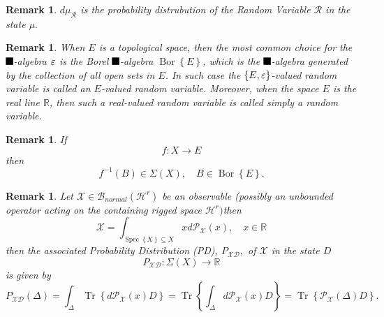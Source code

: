 \documentclass[aps,preprint]{revtex4}%
\providecommand{\U}[1]{\protect\rule{.1in}{.1in}}
\newtheorem{remark}[theorem]{Remark}
\begin{document}
\begin{remark}
$d\mu_{\mathcal{R}}$ is the probability distrubution of the Random Variable
$\mathcal{R}$ in the state $\mu.$
\end{remark}

\begin{remark}
When $E$ is a topological space, then the most common choice for the $\U{3c3}
$-algebra ${\LARGE \varepsilon}$ is the Borel $\U{3c3} $-algebra
$\operatorname*{Bor}\left\{  E\right\}  $, which is the $\U{3c3} $-algebra
generated by the collection of all open sets in $E$. In such case the
$\left\{  E,{\LARGE \varepsilon}\right\}  $-valued random variable is called
an $E$-valued random variable. Moreover, when the space $E$ is the real line
$\mathbb{R}$, then such a real-valued random variable is called simply a
random variable.
\end{remark}

\begin{remark}
If
\begin{equation}
f:X\rightarrow E
\end{equation}
then
\begin{equation}
f^{-1}\left(  B\right)  \in\Sigma\left(  X\right)  ,\quad B\in
\operatorname*{Bor}\left\{  E\right\}  .
\end{equation}

\end{remark}

\begin{remark}
Let $\mathcal{X}\in\mathcal{B}_{normal}\left(  \mathcal{H}^{r}\right)  $ be an
\emph{observable} (possibly an unbounded operator acting on the containing
rigged space $\mathcal{H}^{r})$\qquad then%
\begin{equation}
\mathcal{X=}\int_{\operatorname*{Spec}\left\{  X\right\}  \subseteq
X}xd\mathcal{P}_{\mathcal{X}}\left(  x\right)  ,\quad x\in\mathbb{R}%
\end{equation}
then the associated Probability Distribution (PD), $P_{\mathcal{XD}},$ of
$\mathcal{X}$ in the state $D$
\begin{equation}
P_{\mathcal{XD}}:\Sigma\left(  X\right)  \rightarrow\mathbb{R}%
\end{equation}
is given by
\begin{equation}
P_{\mathcal{XD}}\left(  \Delta\right)  =\int_{\Delta}\operatorname{Tr}\left\{
d\mathcal{P}_{\mathcal{X}}\left(  x\right)  D\right\}  =\operatorname{Tr}%
\left\{  \int_{\Delta}d\mathcal{P}_{\mathcal{X}}\left(  x\right)  D\right\}
=\operatorname{Tr}\left\{  \mathcal{P}_{\mathcal{X}}\left(  \Delta\right)
D\right\}  .
\end{equation}

\end{remark}
\end{document}
